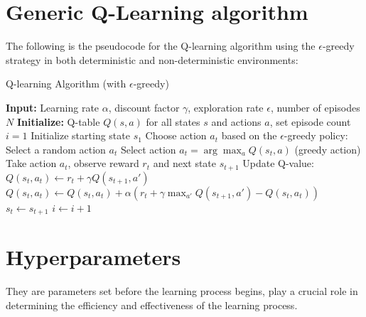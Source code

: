 \section{Generic Q-Learning algorithm}
The following is the pseudocode for the Q-learning algorithm using the $\epsilon$-greedy strategy in both deterministic and non-deterministic environments:
\begin{algorithm}[H]
\caption{Q-learning Algorithm (with $\epsilon$-greedy)}
\begin{algorithmic}[1]
\State \textbf{Input:} Learning rate $\alpha$, discount factor $\gamma$, exploration rate $\epsilon$, number of episodes $N$
\State \textbf{Initialize:} Q-table $Q(s, a)$ for all states $s$ and actions $a$, set episode count $i = 1$
    \State Initialize starting state $s_1$
        \State Choose action $a_t$ based on the $\epsilon$-greedy policy:
            \State Select a random action $a_t$
        \Else
            \State Select action $a_t = \arg\max_{a} Q(s_t, a)$ (greedy action)
        \EndIf
        \State Take action $a_t$, observe reward $r_t$ and next state $s_{t+1}$
        \State Update Q-value:
            \State $Q(s_t, a_t) \leftarrow r_t + \gamma Q(s_{t+1}, a')$
        \Else
            \State $Q(s_t, a_t) \leftarrow Q(s_t, a_t) + \alpha \left( r_t + \gamma \max_{a'} Q(s_{t+1}, a') - Q(s_t, a_t) \right)$
        \EndIf
        \State $s_t \leftarrow s_{t+1}$
    \EndWhile
    \State $i \leftarrow i + 1$
\EndWhile
\end{algorithmic}
\end{algorithm}
\section{Hyperparameters}
They are parameters set before the learning process begins, play a crucial role in determining the efficiency and effectiveness of the learning process. 

